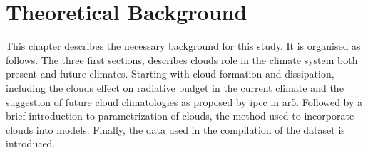 \setcounter{chapter}{1} 
\chapter{Theoretical Background } \label{ch:theoretical_back}
This chapter describes the necessary background for this study. It is organised as follows. The three first sections, describes clouds role in the climate system both present and future climates. Starting with cloud formation and dissipation, including the clouds effect on radiative budget in the current climate and the suggestion of future cloud climatologies as proposed by \acrshort{ipcc} in \acrshort{ar5}. Followed by a brief introduction to parametrization of clouds, the method used to incorporate clouds into models.
Finally, the data used in the compilation of the dataset is introduced. 










